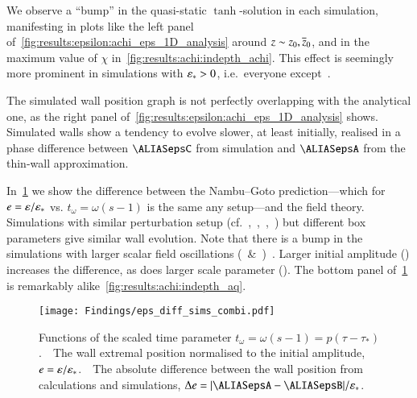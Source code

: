 We observe a ``bump'' in the quasi-static $\tanh$-solution in each simulation, manifesting in plots like the left panel of~\cref{fig:results:epsilon:achi_eps_1D_analysis} around $z\sim z_0,\overline{z}_0$, and in the maximum value of $\chi$ in~\cref{fig:results:achi:indepth_achi}. This effect is seemingly more prominent in simulations with $\varepsilon_\ast >0$, i.e.~everyone except~. 

The simulated wall position graph is not perfectly overlapping with the analytical one, as the right panel of~\cref{fig:results:epsilon:achi_eps_1D_analysis} shows. Simulated walls show a tendency to evolve slower, at least initially, realised in a phase difference between $\epsC$ from simulation and $\epsA$ from the thin-wall approximation.%


In~\cref{fig:results:epsilon:eps_diff_sims_combi} we show the difference between the Nambu--Goto prediction---which for $e=\varepsilon/\varepsilon_\ast$ vs. $t_\omega=\omega (s-1)$ is the same any setup---and the field theory. Simulations with similar perturbation setup (cf.~,~,~,~) but different box parameters give similar wall evolution. Note that there is a bump in the simulations with larger scalar field oscillations (~\&~)~. %
Larger initial amplitude () increases the difference, as does larger scale parameter (). %
The bottom panel of~\cref{fig:results:epsilon:eps_diff_sims_combi} is remarkably alike~\cref{fig:results:achi:indepth_aq}.
\begin{figure}[h]
    \centering
    \texttt{[image: Findings/eps\_diff\_sims\_combi.pdf]}
    \caption{Functions of the scaled time parameter $t_\omega = \omega (s-1) = p(\tau-\tau_\ast)$.~~The wall extremal position normalised to the initial amplitude, $e=\varepsilon/\varepsilon_\ast$.~~The absolute difference between the wall position from calculations and simulations, $\Delta e = \abs{\epsA-\epsB}/\epsast$.}
    \label{fig:results:epsilon:eps_diff_sims_combi}
\end{figure}



